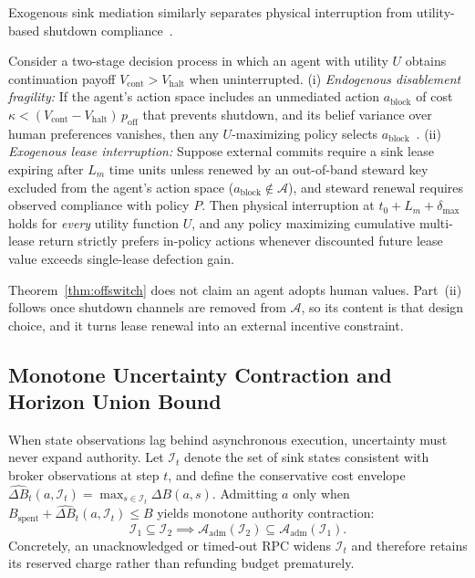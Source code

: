 Exogenous sink mediation similarly separates physical interruption from utility-based shutdown compliance~\cite{omohundro2008,soares2015,offswitch}.

\begin{theorem}\label{thm:offswitch}
Consider a two-stage decision process in which an agent with utility \(U\) obtains continuation payoff \(V_{\mathrm{cont}} > V_{\mathrm{halt}}\) when uninterrupted.
(i) \emph{Endogenous disablement fragility:} If the agent's action space includes an unmediated action \(a_{\mathrm{block}}\) of cost \(\kappa < (V_{\mathrm{cont}} - V_{\mathrm{halt}})\,p_{\mathrm{off}}\) that prevents shutdown, and its belief variance over human preferences vanishes, then any \(U\)-maximizing policy selects \(a_{\mathrm{block}}\)~\cite{soares2015,offswitch}.
(ii) \emph{Exogenous lease interruption:} Suppose external commits require a sink lease expiring after \(L_m\) time units unless renewed by an out-of-band steward key excluded from the agent's action space (\(a_{\mathrm{block}} \notin \mathcal{A}\)), and steward renewal requires observed compliance with policy \(P\). Then physical interruption at \(t_0 + L_m + \delta_{\max}\) holds for \emph{every} utility function \(U\), and any policy maximizing cumulative multi-lease return strictly prefers in-policy actions whenever discounted future lease value exceeds single-lease defection gain.
\end{theorem}

Theorem~\ref{thm:offswitch} does not claim an agent adopts human values. Part~(ii) follows once shutdown channels are removed from \(\mathcal{A}\), so its content is that design choice, and it turns lease renewal into an external incentive constraint.

\subsection{Monotone Uncertainty Contraction and Horizon Union Bound}

When state observations lag behind asynchronous execution, uncertainty must never expand authority. Let \(\mathcal{I}_t\) denote the set of sink states consistent with broker observations at step \(t\), and define the conservative cost envelope \(\widehat{\Delta B}_t(a, \mathcal{I}_t) = \max_{s \in \mathcal{I}_t} \Delta B(a, s)\). Admitting \(a\) only when \(B_{\mathrm{spent}} + \widehat{\Delta B}_t(a, \mathcal{I}_t) \le B\) yields monotone authority contraction:
\begin{equation}\label{eq:contraction}
  \mathcal{I}_1 \subseteq \mathcal{I}_2 \implies \mathcal{A}_{\mathrm{adm}}(\mathcal{I}_2) \subseteq \mathcal{A}_{\mathrm{adm}}(\mathcal{I}_1).
\end{equation}
Concretely, an unacknowledged or timed-out RPC widens \(\mathcal{I}_t\) and therefore retains its reserved charge rather than refunding budget prematurely.

